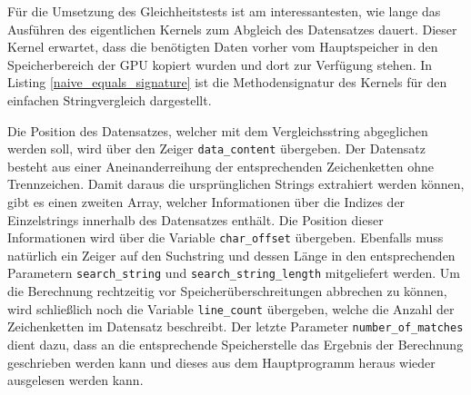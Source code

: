 Für die Umsetzung des Gleichheitstests ist am interessantesten, wie lange das Ausführen des eigentlichen Kernels zum Abgleich des Datensatzes dauert.
Dieser Kernel erwartet, dass die benötigten Daten vorher vom Hauptspeicher in den Speicherbereich der GPU kopiert wurden und dort zur Verfügung stehen.
In Listing \ref{naive_equals_signature} ist die Methodensignatur des Kernels für den einfachen Stringvergleich dargestellt.

Die Position des Datensatzes, welcher mit dem Vergleichsstring abgeglichen werden soll, wird über den Zeiger \texttt{data\_content} übergeben.
Der Datensatz besteht aus einer Aneinanderreihung der entsprechenden Zeichenketten ohne Trennzeichen.
Damit daraus die ursprünglichen Strings extrahiert werden können, gibt es einen zweiten Array, welcher Informationen über die Indizes der Einzelstrings innerhalb des Datensatzes enthält.
Die Position dieser Informationen wird über die Variable \texttt{char\_offset} übergeben.
Ebenfalls muss natürlich ein Zeiger auf den Suchstring und dessen Länge in den entsprechenden Parametern \texttt{search\_string} und \texttt{search\_string\_length} mitgeliefert werden.
Um die Berechnung rechtzeitig vor Speicherüberschreitungen abbrechen zu können, wird schließlich noch die Variable \texttt{line\_count} übergeben, welche die Anzahl der Zeichenketten im Datensatz beschreibt.
Der letzte Parameter \texttt{number\_of\_matches} dient dazu, dass an die entsprechende Speicherstelle das Ergebnis der Berechnung geschrieben werden kann und dieses aus dem Hauptprogramm heraus wieder ausgelesen werden kann.

\newpage


